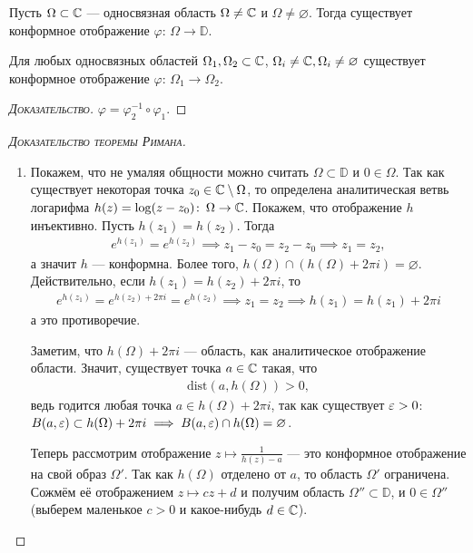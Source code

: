 \documentclass[../complex-analysis.tex]{subfiles}
\begin{document}
\begin{thm}
 Пусть $ \Omega \subset \mathbb{C} $ --- односвязная область  $ \Omega \neq \mathbb{C} $ и $ \Omega \neq \varnothing $. Тогда существует конформное отображение $ \varphi \colon\,\Omega\to\mathbb D $.
\end{thm}
\begin{crly}
 Для любых односвязных областей $ \Omega_1,\Omega_2 \subset \mathbb{C} $, $ \Omega_i \neq \mathbb{C}, \Omega_i \neq \varnothing $ существует конформное отображение $ \varphi \colon\, \Omega_1 \to \Omega_2 $.
\end{crly}
\begin{proof}[\normalfont\textsc{Доказательство}]
 $ \varphi = \varphi_2^{-1} \circ \varphi_1 $.
\end{proof}
\begin{proof}[\normalfont\textsc{Доказательство теоремы Римана}]\
 \begin{enumerate}
  \item Покажем, что не умаляя общности можно считать $ \Omega \subset \mathbb D $ и $ 0 \in \Omega$. Так как существует некоторая точка $ z_0 \in \mathbb{C} \setminus \Omega $, то определена аналитическая ветвь логарифма $ h(z) = \log (z - z_0) \colon\, \Omega \to \mathbb{C} $. Покажем, что отображение $ h $ инъективно. Пусть $ h(z_1) = h(z_2) $. Тогда
   \begin{align*}
    e^{h(z_1)} = e^{h(z_2)} \implies z_1 - z_0 = z_2 - z_0 \implies z_1 = z_2,
   \end{align*} 
   а значит $h$ --- конформна. Более того, $ h(\Omega) \cap (h(\Omega) + 2\pi i) = \varnothing $.
   Действительно, если $ h(z_1) = h(z_2) + 2\pi i $, то
   \begin{align*}
    e^{h(z_1)} = e^{h(z_2) + 2\pi i} = e^{h(z_2)} \implies z_1 = z_2 \implies h(z_1) = h(z_1) + 2 \pi i
   \end{align*} а это противоречие.

   Заметим, что $ h(\Omega) + 2\pi i $ --- область, как аналитическое отображение области.
   Значит, существует точка $ a \in \mathbb{C} $ такая, что
   \begin{align*}
    \mathrm{dist}(a, h(\Omega)) > 0,
   \end{align*} ведь годится любая точка $ a \in h(\Omega) + 2\pi i $, так как существует $ \varepsilon > 0 $: $ B(a,\varepsilon) \subset h(\Omega) + 2\pi i \implies B(a, \varepsilon) \cap h(\Omega) = \varnothing$.

   Теперь рассмотрим отображение $ z \mapsto \frac{1}{h(z) - a} $ --- это конформное отображение на свой образ $ \Omega' $. Так как $ h(\Omega) $ отделено от $ a $, то область $ \Omega' $ ограничена. Сожмём её отображением $ z \mapsto cz + d $ и получим область $ \Omega'' \subset \mathbb D $, и $ 0 \in \Omega'' $ (выберем маленькое $ c > 0 $ и какое-нибудь $ d \in \mathbb{C} $).


\end{enumerate}
\end{proof}
\end{document}
